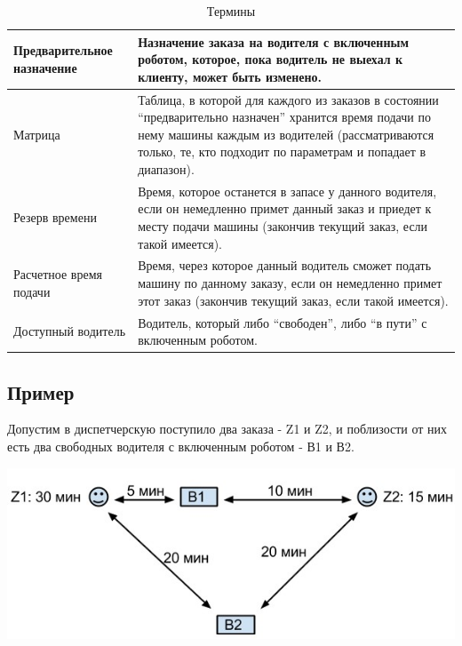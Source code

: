 		\begin{table}[htb]
	        \begin{center}
	        \caption{Термины}
	        \label{appendices_termins}
	        \setlength{\extrarowheight}{2mm}
	        \begin{tabular}{|p{6cm}|p{9cm}|}
	           
	           \hline Предварительное назначение & Назначение заказа на водителя с включенным роботом, которое, пока водитель не выехал к клиенту, может быть изменено.\\ [2mm]

	           \hline Матрица & Таблица, в которой для каждого из заказов в состоянии “предварительно назначен” хранится время подачи по нему машины каждым из водителей (рассматриваются только, те, кто подходит по параметрам и попадает в диапазон).\\ [2mm]

	           \hline Резерв времени & Время, которое останется в запасе у данного водителя, если он немедленно примет данный заказ и приедет к месту подачи машины (закончив текущий заказ, если такой имеется).\\ [2mm]

	           \hline Расчетное время подачи & Время, через которое данный водитель сможет подать машину по данному заказу, если он немедленно примет этот заказ (закончив текущий заказ, если такой имеется).\\ [2mm]

	           \hline Доступный водитель & Водитель, который либо “свободен”, либо “в пути” с включенным роботом.\\ [2mm]    

	           \hline
	        \end{tabular}
	        \end{center}
      	\end{table}

    \subsection{Пример}

    	Допустим в диспетчерскую поступило два заказа - Z1 и Z2, и поблизости от них есть два свободных водителя с включенным роботом - В1 и В2.

    	\includegraphics{images/appendices/appendix_example}

